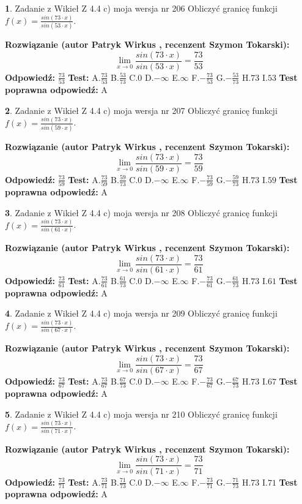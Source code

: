 \documentclass[12pt, a4paper]{article}
\theoremstyle{definition} %
\newtheorem{zad}{}
\newcommand{\zadStart}[1]{\begin{zad}#1\newline}
\newcommand{\zadStop}{\end{zad}}
\newcommand{\rozwStart}[2]{\noindent \textbf{Rozwiązanie (autor #1 , recenzent #2): }\newline}
\newcommand{\rozwStop}{\newline}
\newcommand{\odpStart}{\noindent \textbf{Odpowiedź:}\newline}
\newcommand{\odpStop}{\newline}
\newcommand{\testStart}{\noindent \textbf{Test:}\newline}
\newcommand{\testStop}{\newline}
\newcommand{\kluczStart}{\noindent \textbf{Test poprawna odpowiedź:}\newline}
\newcommand{\kluczStop}{\newline}
\begin{document}
\zadStart{Zadanie z Wikieł Z 4.4 c) moja wersja nr 206}
Obliczyć granicę funkcji $f(x)=\frac{sin(73\cdot x)}{sin(53\cdot x)}$.
\zadStop
\rozwStart{Patryk Wirkus}{Szymon Tokarski}
$$\lim\limits_{x\to 0}\frac{sin(73\cdot x)}{sin(53\cdot x)}=
\frac{73}{53}$$
\rozwStop
\odpStart
$\frac{73}{53}$
\odpStop
\testStart
A.$\frac{73}{53}$
B.$\frac{53}{73}$
C.$0$
D.$-\infty$
E.$\infty$
F.$-\frac{73}{53}$
G.$-\frac{53}{73}$
H.$73$
I.$53$
\testStop
\kluczStart
A
\kluczStop



\zadStart{Zadanie z Wikieł Z 4.4 c) moja wersja nr 207}
Obliczyć granicę funkcji $f(x)=\frac{sin(73\cdot x)}{sin(59\cdot x)}$.
\zadStop
\rozwStart{Patryk Wirkus}{Szymon Tokarski}
$$\lim\limits_{x\to 0}\frac{sin(73\cdot x)}{sin(59\cdot x)}=
\frac{73}{59}$$
\rozwStop
\odpStart
$\frac{73}{59}$
\odpStop
\testStart
A.$\frac{73}{59}$
B.$\frac{59}{73}$
C.$0$
D.$-\infty$
E.$\infty$
F.$-\frac{73}{59}$
G.$-\frac{59}{73}$
H.$73$
I.$59$
\testStop
\kluczStart
A
\kluczStop



\zadStart{Zadanie z Wikieł Z 4.4 c) moja wersja nr 208}
Obliczyć granicę funkcji $f(x)=\frac{sin(73\cdot x)}{sin(61\cdot x)}$.
\zadStop
\rozwStart{Patryk Wirkus}{Szymon Tokarski}
$$\lim\limits_{x\to 0}\frac{sin(73\cdot x)}{sin(61\cdot x)}=
\frac{73}{61}$$
\rozwStop
\odpStart
$\frac{73}{61}$
\odpStop
\testStart
A.$\frac{73}{61}$
B.$\frac{61}{73}$
C.$0$
D.$-\infty$
E.$\infty$
F.$-\frac{73}{61}$
G.$-\frac{61}{73}$
H.$73$
I.$61$
\testStop
\kluczStart
A
\kluczStop



\zadStart{Zadanie z Wikieł Z 4.4 c) moja wersja nr 209}
Obliczyć granicę funkcji $f(x)=\frac{sin(73\cdot x)}{sin(67\cdot x)}$.
\zadStop
\rozwStart{Patryk Wirkus}{Szymon Tokarski}
$$\lim\limits_{x\to 0}\frac{sin(73\cdot x)}{sin(67\cdot x)}=
\frac{73}{67}$$
\rozwStop
\odpStart
$\frac{73}{67}$
\odpStop
\testStart
A.$\frac{73}{67}$
B.$\frac{67}{73}$
C.$0$
D.$-\infty$
E.$\infty$
F.$-\frac{73}{67}$
G.$-\frac{67}{73}$
H.$73$
I.$67$
\testStop
\kluczStart
A
\kluczStop



\zadStart{Zadanie z Wikieł Z 4.4 c) moja wersja nr 210}
Obliczyć granicę funkcji $f(x)=\frac{sin(73\cdot x)}{sin(71\cdot x)}$.
\zadStop
\rozwStart{Patryk Wirkus}{Szymon Tokarski}
$$\lim\limits_{x\to 0}\frac{sin(73\cdot x)}{sin(71\cdot x)}=
\frac{73}{71}$$
\rozwStop
\odpStart
$\frac{73}{71}$
\odpStop
\testStart
A.$\frac{73}{71}$
B.$\frac{71}{73}$
C.$0$
D.$-\infty$
E.$\infty$
F.$-\frac{73}{71}$
G.$-\frac{71}{73}$
H.$73$
I.$71$
\testStop
\kluczStart
A
\kluczStop
\end{document}
